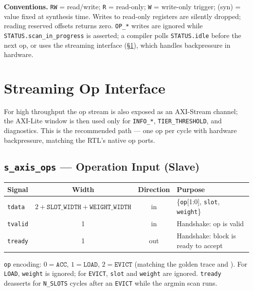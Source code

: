 \documentclass[11pt]{article}
\begin{document}
\noindent\textbf{Conventions.} \texttt{RW} = read/write; \texttt{R} = read-only;
\texttt{W} = write-only trigger; (syn) = value fixed at synthesis time. Writes to
read-only registers are silently dropped; reading reserved offsets returns zero.
\texttt{OP\_*} writes are ignored while \texttt{STATUS.scan\_in\_progress} is
asserted; a compiler polls \texttt{STATUS.idle} before the next op, or uses the
streaming interface (\S\ref{sec:stream}), which handles backpressure in hardware.

\section{Streaming Op Interface}
\label{sec:stream}

For high throughput the op stream is also exposed as an AXI-Stream channel; the
AXI-Lite window is then used only for \texttt{INFO\_*}, \texttt{TIER\_THRESHOLD},
and diagnostics. This is the recommended path --- one op per cycle with hardware
backpressure, matching the RTL's native op ports.

\subsection{\texttt{s\_axis\_ops} --- Operation Input (Slave)}

\begin{table}[h]
\centering
\small
\begin{tabular}{@{}l c c p{7.2cm}@{}}
\toprule
Signal & Width & Direction & Purpose \\
\midrule
\texttt{tdata}  & $2{+}\texttt{SLOT\_WIDTH}{+}\texttt{WEIGHT\_WIDTH}$ & in & \{\texttt{op}[1:0], \texttt{slot}, \texttt{weight}\} \\
\texttt{tvalid} & 1 & in  & Handshake: op is valid \\
\texttt{tready} & 1 & out & Handshake: block is ready to accept \\
\bottomrule
\end{tabular}
\end{table}

\noindent\texttt{op} encoding: $0=\texttt{ACC}$, $1=\texttt{LOAD}$,
$2=\texttt{EVICT}$ (matching the golden trace and
). For \texttt{LOAD}, \texttt{weight} is
ignored; for \texttt{EVICT}, \texttt{slot} and \texttt{weight} are ignored.
\texttt{tready} deasserts for \texttt{N\_SLOTS} cycles after an \texttt{EVICT}
while the argmin scan runs.
\end{document}
